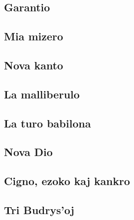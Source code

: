 \documentclass[a5paper,11pt,openany,twoside]{book}
\begin{document}
\subsection{Garantio}
\label{garantio}


\vspace*{-5ex} %


\subsection{Mia mizero}
\label{mizero}


\subsection{Nova kanto}
\label{nova}


\subsection{La malliberulo}
\label{malliberulo}


\subsection{La turo babilona}
\label{turo}

\subsection{Nova Dio}
\label{novadio}


\newpage %

\subsection{Cigno, ezoko kaj kankro}
\label{cigno}


\newpage %

\subsection{Tri Budrys'oj}
\label{tri}

\end{document}
